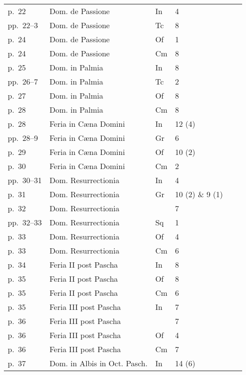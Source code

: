 \begin{longtable}[c]{@{}llllll@{}}
  p.\ 22 & Dom. de Passione & In & 4 & \flat{}\flat{} &  \\
  pp.\ 22--3 & Dom. de Passione & Tc & 8 & \sharp{} &  \\
  p.\ 24 & Dom. de Passione & Of & 1 & \flat{} &  \\
  p.\ 24 & Dom. de Passione & Cm & 8 & \sharp{} &  \\
  p.\ 25 & Dom. in Palmia & In & 8 & \sharp{} &  \\
  pp.\ 26--7 & Dom. in Palmia & Tc & 2 & \sharp{}\sharp{} &  \\
  p.\ 27 & Dom. in Palmia & Of & 8 & \sharp{} &  \\
  p.\ 28 & Dom. in Palmia & Cm & 8 & \sharp{} &  \\
  p.\ 28 & Feria in Cæna Domini & In & 12 (4) & \flat{}\flat{}\flat{} &  \\
  pp.\ 28--9 & Feria in Cæna Domini & Gr & 6 & \sharp{} &  \\
  p.\ 29 & Feria in Cæna Domini & Of & 10 (2) & \sharp{} &  \\
  p.\ 30 & Feria in Cæna Domini & Cm & 2 & \sharp{}\sharp{} &  \\
  pp.\ 30--31 & Dom. Resurrectionia & In & 4 & \flat{}\flat{} &  \\
  p.\ 31 & Dom. Resurrectionia & Gr & 10 (2) \& 9 (1) & \sharp{} &  \\
  p.\ 32 & Dom. Resurrectionia &  & 7 & \flat{} &  \\
  pp.\ 32--33 & Dom. Resurrectionia & Sq & 1 & \flat{}\flat{} &  \\
  p.\ 33 & Dom. Resurrectionia & Of & 4 & \flat{}\flat{} &  \\
  p.\ 33 & Dom. Resurrectionia & Cm & 6 & \flat{}\flat{} &  \\
  p.\ 34 & Feria II post Pascha & In & 8 & \sharp{} &  \\
  p.\ 35 & Feria II post Pascha & Of & 8 & \sharp{} &  \\
  p.\ 35 & Feria II post Pascha & Cm & 6 & \flat{} &  \\
  p.\ 35 & Feria III post Pascha & In & 7 & \flat{} &  \\
  p.\ 36 & Feria III post Pascha &  & 7 & \flat{} &  \\
  p.\ 36 & Feria III post Pascha & Of & 4 & \flat{}\flat{} &  \\
  p.\ 36 & Feria III post Pascha & Cm & 7 & \flat{} &  \\
  p.\ 37 & Dom. in Albis in Oct. Pasch. & In & 14 (6) & \flat{}\flat{}\flat{} &  \\

\end{longtable}
